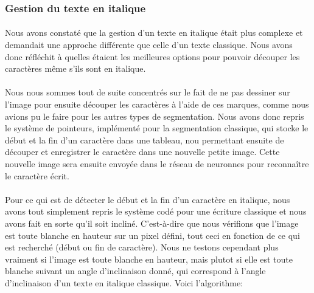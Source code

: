 \documentclass{article}
\begin{document}
    \subsubsection{Gestion du texte en italique}
    \paragraph{}
    Nous avons constaté que la gestion d'un texte en italique était plus complexe et demandait une approche différente que celle d'un texte classique. Nous avons donc réfléchit à quelles étaient les meilleures options pour pouvoir découper les caractères même s'ils sont en italique.

    \paragraph{}
    Nous nous sommes tout de suite concentrés sur le fait de ne pas dessiner sur l'image pour ensuite découper les caractères à l'aide de ces marques, comme nous avions pu le faire pour les autres types de segmentation. Nous avons donc repris le système de pointeurs, implémenté pour la segmentation classique, qui stocke le début et la fin d'un caractère dans une tableau, nou permettant ensuite de découper et enregistrer le caractère dans une nouvelle petite image. Cette nouvelle image sera ensuite envoyée dans le réseau de neuronnes pour reconnaître le caractère écrit.

    \paragraph{}
    Pour ce qui est de détecter le début et la fin d'un caractère en italique, nous avons tout simplement repris le système codé pour une écriture classique et nous avons fait en sorte qu'il soit incliné. C'est-à-dire que nous vérifions que l'image est toute blanche en hauteur sur un pixel défini, tout ceci en fonction de ce qui est recherché (début ou fin de caractère). Nous ne testons cependant plus vraiment si l'image est toute blanche en hauteur, mais plutot si elle est toute blanche suivant un angle d'inclinaison donné, qui correspond à l'angle d'inclinaison d'un texte en italique classique. Voici l'algorithme: \\
\end{document}
